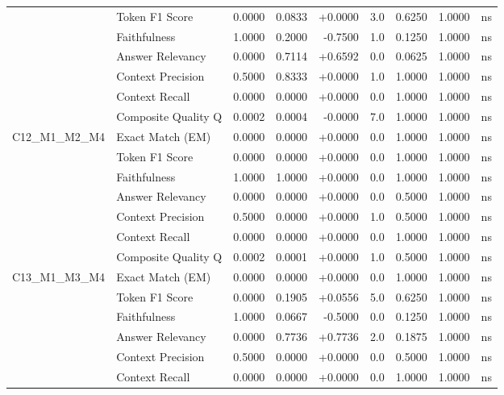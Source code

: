 \begin{table}[p]
\begin{tabular*}{\textwidth}{@{\extracolsep{\fill}} l l r r r r r r c @{}}
                & Token F1 Score       & 0.0000 & 0.0833 & +0.0000 & 3.0 & 0.6250 & 1.0000 & ns \\
                & Faithfulness         & 1.0000 & 0.2000 & -0.7500 & 1.0 & 0.1250 & 1.0000 & ns \\
                & Answer Relevancy     & 0.0000 & 0.7114 & +0.6592 & 0.0 & 0.0625 & 1.0000 & ns \\
                & Context Precision    & 0.5000 & 0.8333 & +0.0000 & 1.0 & 1.0000 & 1.0000 & ns \\
                & Context Recall       & 0.0000 & 0.0000 & +0.0000 & 0.0 & 1.0000 & 1.0000 & ns \\
                & Composite Quality Q  & 0.0002 & 0.0004 & -0.0000 & 7.0 & 1.0000 & 1.0000 & ns \\
\addlinespace
C12\_M1\_M2\_M4 & Exact Match (EM)     & 0.0000 & 0.0000 & +0.0000 & 0.0 & 1.0000 & 1.0000 & ns \\
                & Token F1 Score       & 0.0000 & 0.0000 & +0.0000 & 0.0 & 1.0000 & 1.0000 & ns \\
                & Faithfulness         & 1.0000 & 1.0000 & +0.0000 & 0.0 & 1.0000 & 1.0000 & ns \\
                & Answer Relevancy     & 0.0000 & 0.0000 & +0.0000 & 0.0 & 0.5000 & 1.0000 & ns \\
                & Context Precision    & 0.5000 & 0.0000 & +0.0000 & 1.0 & 0.5000 & 1.0000 & ns \\
                & Context Recall       & 0.0000 & 0.0000 & +0.0000 & 0.0 & 1.0000 & 1.0000 & ns \\
                & Composite Quality Q  & 0.0002 & 0.0001 & +0.0000 & 1.0 & 0.5000 & 1.0000 & ns \\
\addlinespace
C13\_M1\_M3\_M4 & Exact Match (EM)     & 0.0000 & 0.0000 & +0.0000 & 0.0 & 1.0000 & 1.0000 & ns \\
                & Token F1 Score       & 0.0000 & 0.1905 & +0.0556 & 5.0 & 0.6250 & 1.0000 & ns \\
                & Faithfulness         & 1.0000 & 0.0667 & -0.5000 & 0.0 & 0.1250 & 1.0000 & ns \\
                & Answer Relevancy     & 0.0000 & 0.7736 & +0.7736 & 2.0 & 0.1875 & 1.0000 & ns \\
                & Context Precision    & 0.5000 & 0.0000 & +0.0000 & 0.0 & 0.5000 & 1.0000 & ns \\
                & Context Recall       & 0.0000 & 0.0000 & +0.0000 & 0.0 & 1.0000 & 1.0000 & ns \\

\end{tabular*}
\end{table}
